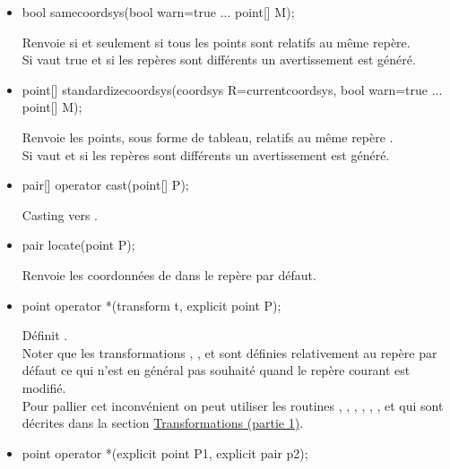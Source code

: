 \documentclass[pdftex]{article}
\newcommand{\ssi}{si et seulement si\xspace}
\begin{document}
\begin{itemize}
\item {}
  \begin{Vcolor}
    bool samecoordsys(bool warn=true ... point[] M);
  \end{Vcolor}
  Renvoie  \ssi tous les points sont relatifs au même repère.\\
  Si  vaut true et si les repères sont différents un
  avertissement est généré.
\item {}
  \begin{Vcolor}
    point[] standardizecoordsys(coordsys R=currentcoordsys,
    bool warn=true ... point[] M);
  \end{Vcolor}
  Renvoie les points, sous forme de tableau, relatifs au même repère .\\
  Si  vaut  et si les repères sont différents un
  avertissement est généré.
\item
  \begin{Vcolor}
    pair[] operator cast(point[] P);
  \end{Vcolor}
  \og{}Casting\fg{}  vers .
\item {}
  \begin{Vcolor}
    pair locate(point P);
  \end{Vcolor}
  Renvoie les coordonnées de  dans le repère par défaut.
\item {}
  \begin{Vcolor}
    point operator *(transform t, explicit point P);
  \end{Vcolor}
  Définit .\\
  Noter que les transformations , ,
   et  sont définies relativement au repère
  par défaut ce qui n'est en général pas souhaité quand le repère
  courant est modifié.\\
  Pour pallier cet inconvénient on peut utiliser les routines
  , , ,
  , ,
  ,  et 
  qui sont décrites dans la section \href{section.transform1}{Transformations (partie 1)}.
\item {}
  \begin{Vcolor}
    point operator *(explicit point P1, explicit pair p2);

\end{Vcolor}
\end{itemize}
\end{document}
